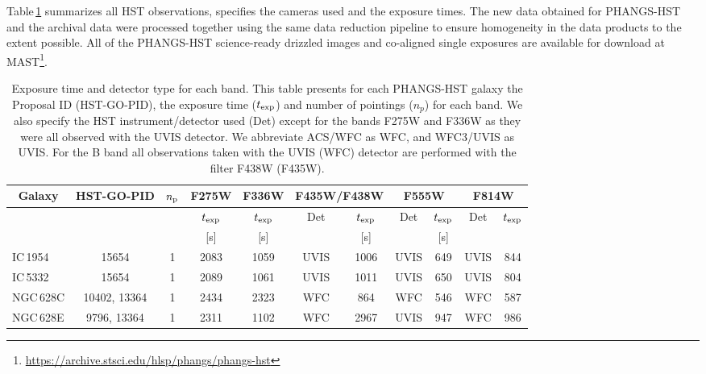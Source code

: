 \documentclass[linenumbers]{aastex63}
\begin{document}
Table\,\ref{tab:exp_time} summarizes all HST observations, specifies the cameras used and the exposure times. The new data obtained for PHANGS-HST and the archival data were processed together using the same data reduction pipeline \citep[as summarized by][]{lee_phangs-hst_2022} to ensure homogeneity in the data products to the extent possible.  All of the PHANGS-HST science-ready drizzled images and co-aligned single exposures are available for download at MAST\footnote{\url{https://archive.stsci.edu/hlsp/phangs/phangs-hst}}. 
\begin{table*}
\begin{center}
\caption{Exposure time and detector type for each band. This table presents for each PHANGS-HST galaxy the Proposal ID (HST-GO-PID), the exposure time ($t_{\rm exp}$) and number of pointings ($n_{p}$) for each band. We also specify the HST instrument/detector used (Det) except for the bands F275W and F336W as they were all observed with the UVIS detector. We abbreviate ACS/WFC as WFC, and WFC3/UVIS as UVIS. For the B band all observations taken with the UVIS (WFC) detector are performed with the filter F438W (F435W). }  
\label{tab:exp_time}
\begin{tabular}{lcccccccccc}
\multicolumn{1}{c}{Galaxy} & \multicolumn{1}{c}{HST-GO-PID} & \multicolumn{1}{c}{${n_{\rm p}}$} & \multicolumn{1}{c}{F275W} & \multicolumn{1}{c}{F336W} & \multicolumn{2}{c}{F435W/F438W} & \multicolumn{2}{c}{F555W} & \multicolumn{2}{c}{F814W} \\ 
\hline
\multicolumn{1}{c}{} & \multicolumn{1}{c}{} & \multicolumn{1}{c}{} & \multicolumn{1}{c}{${t_{\rm exp}}$} & \multicolumn{1}{c}{${t_{\rm exp}}$} & \multicolumn{1}{c}{Det} & \multicolumn{1}{c}{${t_{\rm exp}}$} & \multicolumn{1}{c}{Det} & \multicolumn{1}{c}{${t_{\rm exp}}$} & \multicolumn{1}{c}{Det} & \multicolumn{1}{c}{${t_{\rm exp}}$} \\ 
\hline
\multicolumn{1}{c}{} & \multicolumn{1}{c}{} & \multicolumn{1}{c}{} & \multicolumn{1}{c}{[s]} & \multicolumn{1}{c}{[s]} & \multicolumn{1}{c}{} & \multicolumn{1}{c}{[s]} & \multicolumn{1}{c}{} & \multicolumn{1}{c}{[s]} \\ 
\hline
IC\,1954 & 15654 & 1 & 2083 & 1059 & UVIS & 1006 & UVIS & 649 & UVIS & 844\\
IC\,5332 & 15654 & 1 & 2089 & 1061 & UVIS & 1011 & UVIS & 650 & UVIS & 804\\
NGC\,628C & 10402, 13364 & 1 & 2434 & 2323 & WFC & 864 & WFC & 546 & WFC & 587\\
NGC\,628E & 9796, 13364 & 1 & 2311 & 1102 & WFC & 2967 & UVIS & 947 & WFC & 986\\

\end{tabular}
\end{center}
\end{table*}
\end{document}

